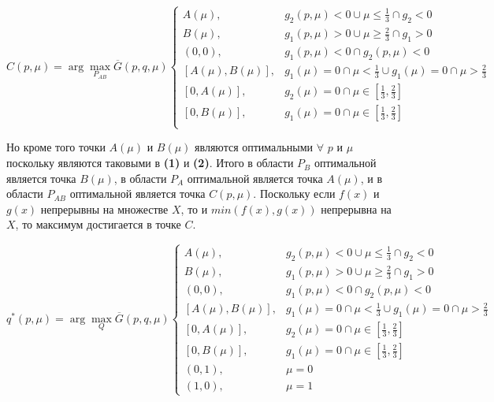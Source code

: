 \begin{flushleft}
	$C(p,\mu) = \arg \max \limits_{P_{AB}} \overline{G}(p,q,\mu)
	\begin{cases}
	A(\mu), & g_2(p,\mu)<0 \cup \mu \leqslant \frac{1}{3} \cap g_2 < 0 \\
	B(\mu), & g_1(p,\mu)>0 \cup \mu \geqslant \frac{2}{3} \cap g_1 > 0 \\
	(0,0),  & g_1(p,\mu)<0 \cap g_2(p,\mu)<0 \\
	[A(\mu), B(\mu)], 
	& g_1(\mu)=0 \cap \mu < \frac{1}{3} \cup g_1(\mu)=0 \cap \mu > \frac{2}{3} \\
	[0, A(\mu)], & g_2(\mu)=0 \cap \mu \in [\frac{1}{3},\frac{2}{3}] \\
	[0, B(\mu)], & g_1(\mu)=0 \cap \mu \in [\frac{1}{3},\frac{2}{3}] \\
	\end{cases}	
	$	
	
	Но кроме того точки $A(\mu)$ и $B(\mu)$ являются оптимальными 
	$\forall$ $p$ и $\mu$ поскольку	являются таковыми в \textbf{(1)} и \textbf{(2)}.
	Итого в области $P_B$ оптимальной является точка $B(\mu)$,
	в области $P_A$ оптимальной является точка $A(\mu)$,
	и в области $P_{AB}$ оптимальной является точка $C(p, \mu)$.
	Поскольку если $f(x)$ и $g(x)$ непрерывны на множестве $X$, то и 
	$min(f(x), g(x))$ непрерывна на $X$, то максимум достигается в точке
	$C$.
	
	$q^*(p,\mu)= \arg \max \limits_Q \overline{G}(p,q,\mu)
	\begin{cases}
	A(\mu), & g_2(p,\mu)<0 \cup \mu \leqslant \frac{1}{3} \cap g_2 < 0 \\
	B(\mu), & g_1(p,\mu)>0 \cup \mu \geqslant \frac{2}{3} \cap g_1 > 0 \\
	(0,0),  & g_1(p,\mu)<0 \cap g_2(p,\mu)<0 \\
	[A(\mu), B(\mu)], 
	& g_1(\mu)=0 \cap \mu < \frac{1}{3} \cup g_1(\mu)=0 \cap \mu > \frac{2}{3} \\
	[0, A(\mu)], & g_2(\mu)=0 \cap \mu \in [\frac{1}{3},\frac{2}{3}] \\
	[0, B(\mu)], & g_1(\mu)=0 \cap \mu \in [\frac{1}{3},\frac{2}{3}] \\
	(0,1), & \mu = 0 \\
	(1,0), & \mu = 1
	\end{cases}	
	$		
	
	

	

\end{flushleft}
